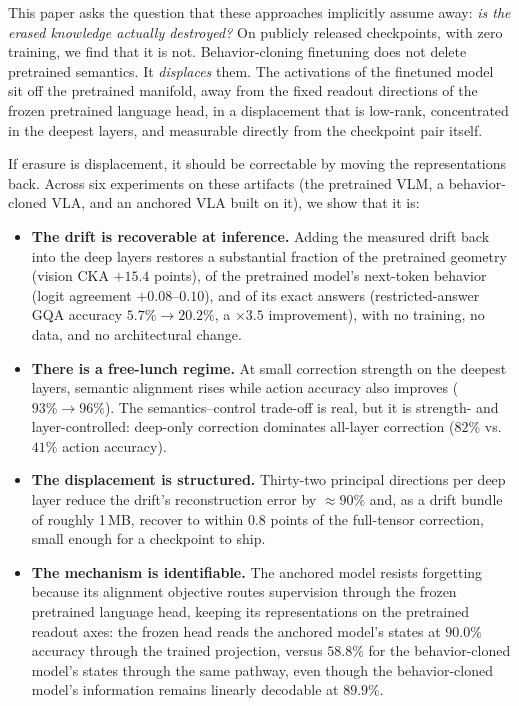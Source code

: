 \documentclass{article}
\begin{document}
This paper asks the question that these approaches implicitly assume away: \emph{is the erased
knowledge actually destroyed?} On publicly released checkpoints, with zero training, we find
that it is not. Behavior-cloning finetuning does not delete pretrained semantics. It
\emph{displaces} them. The activations of the finetuned model sit off the pretrained manifold,
away from the fixed readout directions of the frozen pretrained language head, in a
displacement that is low-rank, concentrated in the deepest layers, and measurable directly
from the checkpoint pair itself.

If erasure is displacement, it should be correctable by moving the representations back. Across
six experiments on these artifacts (the pretrained VLM, a behavior-cloned VLA, and an
anchored VLA built on it), we show that it is:

\begin{itemize}
	\item \textbf{The drift is recoverable at inference.} Adding the measured drift back into
	the deep layers restores a substantial fraction of the pretrained geometry (vision CKA
	$+15.4$ points), of the pretrained model's next-token behavior (logit agreement
	$+0.08$--$0.10$), and of its exact answers (restricted-answer GQA accuracy
	$5.7\% \rightarrow 20.2\%$, a $\times 3.5$ improvement), with no training, no data, and
	no architectural change.
	\item \textbf{There is a free-lunch regime.} At small correction strength on the deepest
	layers, semantic alignment rises while action accuracy also improves ($93\% \rightarrow 96\%$).
	The semantics--control trade-off is real, but it is strength- and layer-controlled:
	deep-only correction dominates all-layer correction ($82\%$ vs.\ $41\%$ action accuracy).
	\item \textbf{The displacement is structured.} Thirty-two principal directions per deep
	layer reduce the drift's reconstruction error by $\approx 90\%$ and, as a drift bundle of
	roughly 1\,MB, recover to within $0.8$ points of the full-tensor correction, small
	enough for a checkpoint to ship.
	\item \textbf{The mechanism is identifiable.} The anchored model resists forgetting because
	its alignment objective routes supervision through the frozen pretrained language head,
	keeping its representations on the pretrained readout axes: the frozen head reads the
	anchored model's states at $90.0\%$ accuracy through the trained projection, versus
	$58.8\%$ for the behavior-cloned model's states through the same pathway, even though
	the behavior-cloned model's information remains linearly decodable at $89.9\%$.
\end{itemize}
\end{document}
